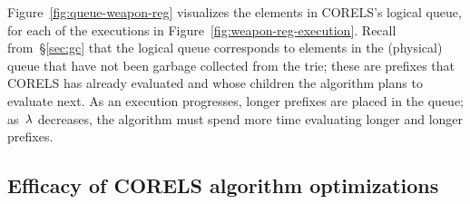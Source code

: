 Figure~\ref{fig:queue-weapon-reg} visualizes the elements in CORELS's logical queue,
for each of the executions in Figure~\ref{fig:weapon-reg-execution}.
%
Recall from~\S\ref{sec:gc} that the logical queue corresponds to elements in the
(physical) queue that have not been garbage collected from the trie; these are prefixes that
CORELS has already evaluated and whose children the algorithm plans to evaluate next.
%
As an execution progresses, longer prefixes are placed in the queue;
as~${\lambda}$ decreases, the algorithm must spend more time evaluating longer and longer prefixes.

\subsection{Efficacy of CORELS algorithm optimizations}
\label{sec:ablation}

